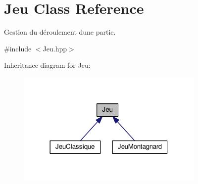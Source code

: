 \hypertarget{classJeu}{}\section{Jeu Class Reference}
\label{classJeu}


Gestion du déroulement d\textquotesingle{}une partie.  




{\ttfamily \#include $<$Jeu.\+hpp$>$}



Inheritance diagram for Jeu\+:
\nopagebreak
\begin{figure}[H]
\begin{center}
\leavevmode
\includegraphics[width=258pt]{classJeu__inherit__graph}
\end{center}
\end{figure}
